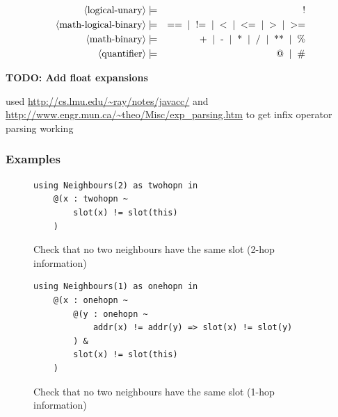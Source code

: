 \begin{eqnarray*}
	\pn{logical-unary} & \pp & \sm{!} \\
	\pn{math-logical-binary} & \pp & \sm{==} \oo \sm{!=} \oo \sm{\textless} \oo \sm{\textless=} \oo \sm{\textgreater} \oo \sm{\textgreater=} \\
	\pn{math-binary} & \pp & \sm{+} \oo \sm{-} \oo \sm{*} \oo \sm{/} \oo \sm{**} \oo \sm{\%} \\
%
%
	\pn{quantifier} & \pp & \sm{@} \oo \sm{\#} \\
\end{eqnarray*}

\textbf{TODO: Add float expansions}

used \url{http://cs.lmu.edu/~ray/notes/javacc/} and \url{http://www.engr.mun.ca/~theo/Misc/exp_parsing.htm} to get infix operator parsing working

\subsubsection{Examples}

\begin{figure}[H]
\begin{verbatim}
using Neighbours(2) as twohopn in
    @(x : twohopn ~
        slot(x) != slot(this)
    )
\end{verbatim}
\caption{Check that no two neighbours have the same slot (2-hop information)}
\label{fig:two-hop-slot-pred-lang}
\end{figure}

\begin{figure}[H]
\begin{verbatim}
using Neighbours(1) as onehopn in
    @(x : onehopn ~
        @(y : onehopn ~
            addr(x) != addr(y) => slot(x) != slot(y)
        ) & 
        slot(x) != slot(this)
    )
\end{verbatim}
\caption{Check that no two neighbours have the same slot (1-hop information)}
\label{fig:one-hop-slot-pred-lang}
\end{figure}

